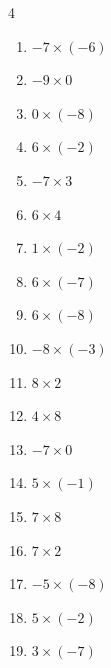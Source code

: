 


\setcounter{quesnum}{120}

\begin{multicols}{4}
\begin{enumerate}
  \itemsep=5pt
  \item $-7\times (-6)$
        \phantom{$=42$}

  \item $-9\times 0$
        \phantom{$=0$}

  \item $0\times (-8)$
        \phantom{$=0$}

  \item $6\times (-2)$
        \phantom{$=-12$}

  \item $-7\times 3$
        \phantom{$=-21$}

  \item $6\times 4$
        \phantom{$=24$}

  \item $1\times (-2)$
        \phantom{$=-2$}

  \item $6\times (-7)$
        \phantom{$=-42$}

  \item $6\times (-8)$
        \phantom{$=-48$}

  \item $-8\times (-3)$
        \phantom{$=24$}

  \item $8\times 2$
        \phantom{$=16$}

  \item $4\times 8$
        \phantom{$=32$}

  \item $-7\times 0$
        \phantom{$=0$}

  \item $5\times (-1)$
        \phantom{$=-5$}

  \item $7\times 8$
        \phantom{$=56$}

  \item $7\times 2$
        \phantom{$=14$}

  \item $-5\times (-8)$
        \phantom{$=40$}

  \item $5\times (-2)$
        \phantom{$=-10$}

  \item $3\times (-7)$
        \phantom{$=-21$}


\end{enumerate}
\end{multicols}
